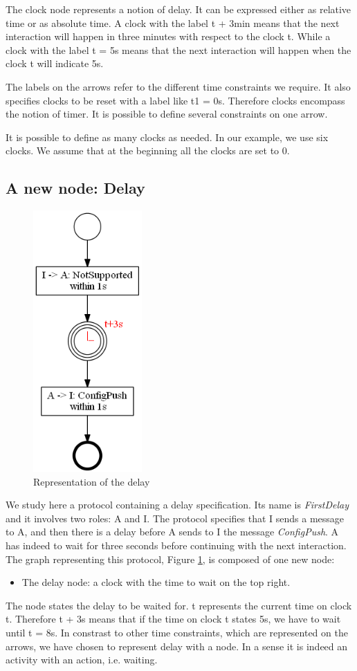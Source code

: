 \documentclass[a4paper,11pt,twoside]{report}
\begin{document}
The clock node represents a notion of delay. It can be expressed either as relative time or as absolute time. A clock with the label t + 3min means that the next interaction will happen in three minutes with respect to the clock t. While a clock with the label t = 5s means that the next interaction will happen when the clock t will indicate 5s.

The labels on the arrows refer to the different time constraints we require. It also specifies clocks to be reset with a label like t1 = 0s. Therefore clocks encompass the notion of timer. It is possible to define several constraints on one arrow.

It is possible to define as many clocks as needed. In our example, we use six clocks. We assume that at the beginning all the clocks are set to 0.

\subsection{A new node: Delay}
\begin{figure}[h]
\begin{center}
\includegraphics[height=10cm]{Delay}\caption{Representation of the delay}
\label{fig:Delay}
\end{center}
\end{figure}
We study here a protocol containing a delay specification. Its name is \emph{FirstDelay} and it involves two roles: A and I. The protocol specifies that I sends a message to A, and then there is a delay before A sends to I the message \emph{ConfigPush}. A has indeed to wait for three seconds before continuing with the next interaction.\\
The graph representing this protocol, Figure \ref{fig:Delay}, is composed of one new node:
\begin{itemize}
\item The delay node: a clock with the time to wait on the top right.
\end{itemize}
The node states the delay to be waited for. t represents the current time on clock t. Therefore t + 3s means that if the time on clock t states 5s, we have to wait until t = 8s. In constrast to other time constraints, which are represented on the arrows, we have chosen to represent delay with a node. In a sense it is indeed an activity with an action, i.e. waiting.
\end{document}
